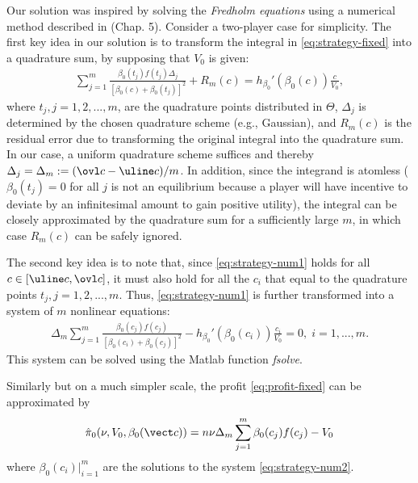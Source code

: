 \documentclass{sig-alternate-10pt}
\begin{document}
Our solution was inspired by solving the {\em Fredholm equations} using a numerical method described in \cite{numeric90NASA} (Chap. 5). Consider a two-player case for simplicity. The first key idea in our solution is to transform the integral in \eqref{eq:strategy-fixed} into a quadrature sum, by supposing that $V_0$ is given:
\begin{align}\label{eq:strategy-num1}
\sum_{j=1}^m \frac{\beta_0(t_j) f(t_j) \Delta_j} {[\beta_0(c) + \beta_0(t_j)]^2} + R_m(c)
= h_{\beta_0}'(\beta_0(c)) \frac{c}{V_0},
\end{align}
where $t_j, j=1,2,...,m$, are the quadrature points distributed in $\Theta$, $\Delta_j$ is determined by the chosen quadrature scheme (e.g., Gaussian), and $R_m(c)$ is the residual error due to transforming the original integral into the quadrature sum. In our case, a uniform quadrature scheme suffices and thereby $\Delta_j=\Delta_m:=(\ovl c - \uline c)/m$. In addition, since the integrand is atomless ($\beta_0(t_j)=0$ for all $j$ is not an equilibrium because a player will have incentive to deviate by an infinitesimal amount to gain positive utility), the integral can be closely approximated by the quadrature sum for a sufficiently large $m$, in which case $R_m(c)$ can be safely ignored.

The second key idea is to note that, since \eqref{eq:strategy-num1} holds for all $c\in[\uline c,\ovl c]$, it must also hold for all the $c_i$ that equal to the quadrature points $t_j, j=1,2,...,m$. Thus, \eqref{eq:strategy-num1} is further transformed into a system of $m$ nonlinear equations:
\begin{align}\label{eq:strategy-num2}
\Delta_m \sum_{j=1}^m 
\frac{\beta_0(c_j) f(c_j)} {[\beta_0(c_i) + \beta_0(c_j)]^2}
- h_{\beta_0}'(\beta_0(c_i)) \frac{c_i}{V_0} = 0,\; i=1,...,m.
\end{align}
This system can be solved using the Matlab function {\it fsolve}.

Similarly but on a much simpler scale, the profit \eqref{eq:profit-fixed} can be approximated by
\begin{align}\label{eq:profit-num}
\hat\pi_0(\nu, V_0,\beta_0(\vect c)) = n \nu \Delta_m \sum_{j=1}^m \beta_0(c_j) f(c_j) - V_0
\end{align}
where $\beta_0(c_i)|_{i=1}^m$ are the solutions to the system \eqref{eq:strategy-num2}.
\end{document}
